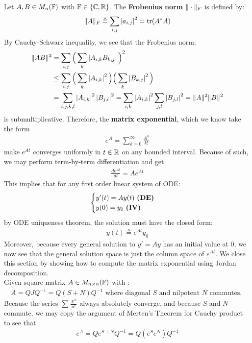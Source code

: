 \documentclass{report}
\begin{document}
Let $A,B \in M_n(\mathbb{F})$ with $\mathbb{F} \in \left\{ \mathbb{C},\mathbb{R} \right\}$. The \textbf{Frobenius norm} $\| \cdot \|_F$ is defined by: 
\begin{align*}
\| A \|_F \triangleq \sum_{i,j} \left|a_{i,j}\right|^2 = \operatorname{tr}(A^*A) 
\end{align*}
By Cauchy-Schwarz inequality, we see that the Frobenius norm:  
\begin{align*}
  \| AB \|^2 &= \sum_{i,j} \Big(\sum_k \left|A_{i,k}B_{k,j}\right| \Big)^2 \\
&\leq \sum_{i,j}  \Big(\sum_k \left|A_{i,k}\right|^2\Big) \Big( \sum_k \left|B_{k,j}\right|^2\Big) \\
&=\sum_{i,j,k,l} \left|A_{i,k}\right|^2 \left|B_{j,l}\right|^2 = \sum_{i,k} \left|A_{i,k}\right|^2 \sum_{j,l} \left|B_{j,l}\right|^2 = \| A \|^2 \| B \|^2
\end{align*}
is submultiplicative. Therefore, the  \textbf{matrix exponential}, which we know take the form   
\begin{align*}
e^A = \sum_{k=0}^{\infty} \frac{A^k}{k!}
\end{align*}
make $e^{At}$ converges uniformly in $t\in\mathbb{R}$ on any bounded interval. Because of such, we may perform term-by-term differentiation and get 
\begin{align*}
\frac{de^{At}}{dt}=Ae^{At}
\end{align*}
This implies that for any first order linear system of ODE: 
\begin{align*}
\begin{cases}
  y'(t)=Ay(t)\text{ \textbf{(DE)} } \\
  y(0)=y_0\text{ \textbf{(IV)} }
\end{cases}
\end{align*}
by ODE uniqueness theorem, the solution must have the closed form: 
\begin{align*}
y(t)\triangleq e^{At}y_0
\end{align*}
Moreover, because every general solution to $y'=Ay$ has an initial value at $0$, we now see that the general solution space is just the column space of $e^{At}$. We close this section by showing how to compute the matrix exponential using Jordan decomposition.\\ 

Given square matrix $A\in M_{n\times n}(\mathbb{F})$ with : 
\begin{align*}
A=QJQ^{-1}=Q(S+N)Q^{-1}\text{ where diagonal $S$ and nilpotent  $N$ commutes. }
\end{align*}
Because the series $\sum  \frac{X^n}{n!}$ always absolutely converge, and because $S$ and $N$ commute, we may copy the argument of Merten's Theorem for Cauchy product to see that  
\begin{align*}
e^{A}=Qe^{S+N}Q^{-1}=Q(e^{S}e^{N})Q^{-1}
\end{align*}
\end{document}
